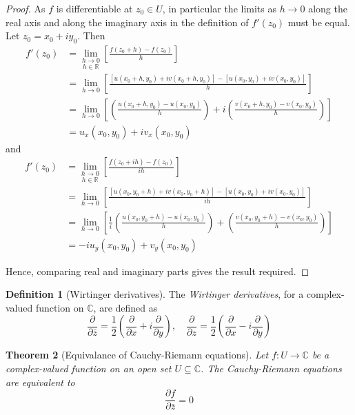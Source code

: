 \documentclass[10pt,fleqn]{article}
\newcommand{\comps}{\mathbb{C}}
\newcommand{\reals}{\mathbb{R}}
\theoremstyle{definition} \newtheorem{defn}{Definition}[section]
\theoremstyle{plain}      \newtheorem{thm}[defn]{Theorem}
\theoremstyle{definition} \newtheorem{prop}[defn]{Proposition}
\theoremstyle{plain}      \newtheorem{lem}[defn]{Lemma}
\theoremstyle{definition} \newtheorem{cor}[defn]{Corollary}
\theoremstyle{definition} \newtheorem{ex}[defn]{Example}
\theoremstyle{definition} \newtheorem{rem}[defn]{Remark}
\begin{document}
\begin{proof}
    As $f$ is differentiable at $z_0\in U$, in particular the limits as $h\to0$ along the real axis and along the imaginary axis in the definition of $f'(z_0)$ must be equal.
    Let $z_0=x_0+iy_0$.
    Then
    \begin{align*}
        f'(z_0)
        &=
        \underset{h\in\reals}{\lim_{h\to0}}\left[\frac{f(z_0+h)-f(z_0)}{h}\right]\\
        &=
        \lim_{h\to0}\left[\frac{[u(x_0+h,y_0)+iv(x_0+h,y_0)]-[u(x_0,y_0)+iv(x_0,y_0)]}{h}\right]\\
        &=
        \lim_{h\to0}\left[\left(\frac{u(x_0+h,y_0)-u(x_0,y_0)}{h}\right)+i\left(\frac{v(x_0+h,y_0)-v(x_0,y_0)}{h}\right)\right]\\
        &=
        u_x(x_0,y_0)+iv_x(x_0,y_0)
    \end{align*}
    and
    \begin{align*}
        f'(z_0)
        &=
        \underset{h\in\reals}{\lim_{h\to0}}\left[\frac{f(z_0+ih)-f(z_0)}{ih}\right]\\
        &=
        \lim_{h\to0}\left[\frac{[u(x_0,y_0+h)+iv(x_0,y_0+h)]-[u(x_0,y_0)+iv(x_0,y_0)]}{ih}\right]\\
        &=
        \lim_{h\to0}\left[\frac{1}{i}\left(\frac{u(x_0,y_0+h)-u(x_0,y_0)}{h}\right)+\left(\frac{v(x_0,y_0+h)-v(x_0,y_0)}{h}\right)\right]\\
        &=
        -iu_y(x_0,y_0)+v_y(x_0,y_0)
    \end{align*}

    Hence, comparing real and imaginary parts gives the result required.
\end{proof}

\begin{defn}[Wirtinger derivatives]
    The \emph{Wirtinger derivatives}, for a complex-valued function on $\comps$, are defined as
    \begin{equation}
        \frac{\partial}{\partial\bar{z}}=\frac{1}{2}\left(\frac{\partial}{\partial x}+i\frac{\partial}{\partial y}\right),\quad
        \frac{\partial}{\partial z}=\frac{1}{2}\left(\frac{\partial}{\partial x}-i\frac{\partial}{\partial y}\right)
    \end{equation}
\end{defn}

\begin{thm}[Equivalance of Cauchy-Riemann equations]
    Let $f:U\to\comps$ be a complex-valued function on an open set $U\subseteq\comps$.
    The Cauchy-Riemann equations are equivalent to
    \[
        \frac{\partial f}{\partial\bar{z}}=0
    \]
\end{thm}
\end{document}
